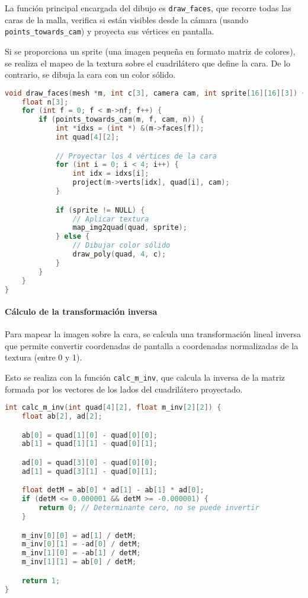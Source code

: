 \documentclass[12pt]{article}
\begin{document}
    La función principal encargada del dibujo es \texttt{draw\_faces}, que recorre todas las caras de la malla, verifica si están visibles desde la cámara (usando \texttt{points\_towards\_cam}) y proyecta sus vértices en pantalla.

    Si se proporciona un sprite (una imagen pequeña en formato matriz de colores), se realiza el mapeo de la textura sobre el cuadrilátero que define la cara. De lo contrario, se dibuja la cara con un color sólido.

    \begin{lstlisting}[language=C, caption={Dibujo de caras con aplicación opcional de texturas}]
void draw_faces(mesh *m, int c[3], camera cam, int sprite[16][16][3]) {
    float n[3];
    for (int f = 0; f < m->nf; f++) {
        if (points_towards_cam(m, f, cam, n)) {
            int *idxs = (int *) &(m->faces[f]);
            int quad[4][2];

            // Proyectar los 4 vértices de la cara
            for (int i = 0; i < 4; i++) {
                int idx = idxs[i];
                project(m->verts[idx], quad[i], cam);
            }

            if (sprite != NULL) {
                // Aplicar textura
                map_img2quad(quad, sprite);
            } else {
                // Dibujar color sólido
                draw_poly(quad, 4, c);
            }
        }
    }
}
    \end{lstlisting}

    \paragraph{Cálculo de la transformación inversa}

    Para mapear la imagen sobre la cara, se calcula una transformación lineal inversa que permite convertir coordenadas de pantalla a coordenadas normalizadas de la textura (entre 0 y 1).

    Esto se realiza con la función \texttt{calc\_m\_inv}, que calcula la inversa de la matriz formada por los vectores de los lados del cuadrilátero proyectado.

    \begin{lstlisting}[language=C, caption={Cálculo de la matriz inversa de transformación}]
int calc_m_inv(int quad[4][2], float m_inv[2][2]) {
    float ab[2], ad[2];

    ab[0] = quad[1][0] - quad[0][0];
    ab[1] = quad[1][1] - quad[0][1];

    ad[0] = quad[3][0] - quad[0][0];
    ad[1] = quad[3][1] - quad[0][1];

    float detM = ab[0] * ad[1] - ab[1] * ad[0];
    if (detM <= 0.000001 && detM >= -0.000001) {
        return 0; // Determinante cero, no se puede invertir
    }

    m_inv[0][0] = ad[1] / detM;
    m_inv[0][1] = -ad[0] / detM;
    m_inv[1][0] = -ab[1] / detM;
    m_inv[1][1] = ab[0] / detM;

    return 1;
}
    \end{lstlisting}
\end{document}
